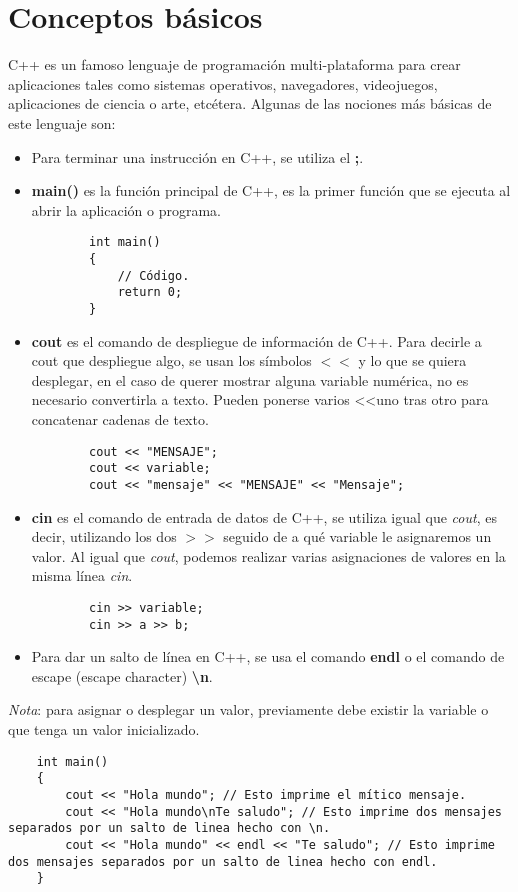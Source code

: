 \section{Conceptos básicos}

C++ es un famoso lenguaje de programación multi-plataforma para crear aplicaciones tales como sistemas operativos, navegadores, videojuegos, aplicaciones de ciencia o arte, etcétera. Algunas de las nociones más básicas de este lenguaje son:
\begin{itemize}
    \item Para terminar una instrucción en C++, se utiliza el \textbf{;}.
    \item \textbf{main()} es la función principal de C++, es la primer función que se ejecuta al abrir la aplicación o programa.
    \begin{lstlisting}
        int main()
        {
            // Código.
            return 0;
        }
    \end{lstlisting}
    \item \textbf{cout} es el comando de despliegue de información de C++. Para decirle a cout que despliegue algo, se usan los símbolos \textbf{$<<$} y lo que se quiera desplegar, en el caso de querer mostrar alguna variable numérica, no es necesario convertirla a texto. Pueden ponerse varios \textless\textless uno tras otro para concatenar cadenas de texto.
    \begin{lstlisting}
        cout << "MENSAJE";
        cout << variable;
        cout << "mensaje" << "MENSAJE" << "Mensaje";
    \end{lstlisting}
    \item \textbf{cin} es el comando de entrada de datos de C++, se utiliza igual que \textit{cout}, es decir, utilizando los dos \textbf{$>>$} seguido de a qué variable le asignaremos un valor. Al igual que \textit{cout}, podemos realizar varias asignaciones de valores en la misma línea \textit{cin}.
    \begin{lstlisting}
        cin >> variable;
        cin >> a >> b;
    \end{lstlisting}
    \item Para dar un salto de línea en C++, se usa el comando \textbf{endl} o el comando de escape (escape character) \textbf{\textbackslash n}.
\end{itemize}

\textit{Nota}: para asignar o desplegar un valor, previamente debe existir la variable o que tenga un valor inicializado.
\begin{lstlisting}
    int main()
    {
        cout << "Hola mundo"; // Esto imprime el mítico mensaje.
        cout << "Hola mundo\nTe saludo"; // Esto imprime dos mensajes separados por un salto de linea hecho con \n.
        cout << "Hola mundo" << endl << "Te saludo"; // Esto imprime dos mensajes separados por un salto de linea hecho con endl.
    }
\end{lstlisting}



